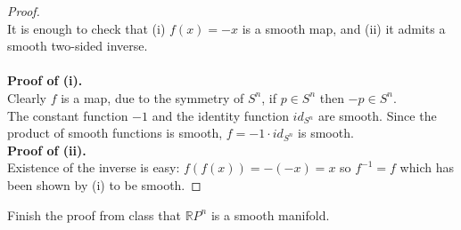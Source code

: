 \documentclass{article}
\newenvironment{problem}[2][Problem]{\begin{trivlist}
\item[\hskip \labelsep {\bfseries #1}\hskip \labelsep {\bfseries #2.}]}{\end{trivlist}}
\begin{document}
\begin{proof} \text{}\\
  It is enough to check that
    (i) $f(x) = -x$ is a smooth map, and
    (ii) it admits a smooth two-sided inverse.\\
  \\
  \textbf{Proof of (i).} \\
  Clearly $f$ is a map, due to the symmetry of $S^n$, if $p \in S^n$ then $-p \in S^n$.\\
  The constant function $-1$ and the identity function $id_{S^n}$ are smooth.
  Since the product of smooth functions is smooth, $f = -1 \cdot id_{S^n}$
  is smooth.
  \\
  \textbf{Proof of (ii).} \\
  Existence of the inverse is easy: $f(f(x)) = -(-x) = x$ so $f^{-1} = f$ which
  has been shown by (i) to be smooth.
\end{proof}

\pagebreak

\begin{problem}{5}
  Finish the proof from class that $\mathbb{R}P^n$ is a smooth manifold.
\end{problem}
\end{document}
